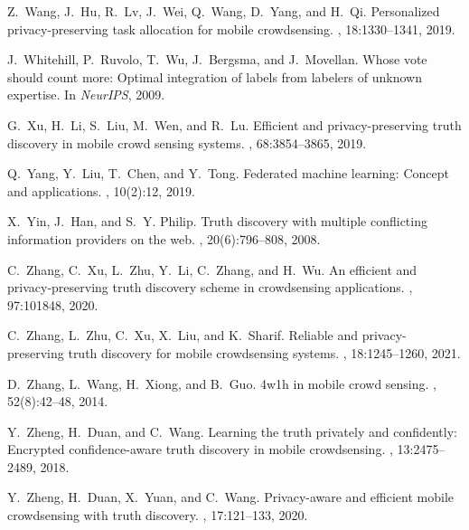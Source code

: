 \documentclass[11pt]{article}
\begin{document}
\begin{thebibliography}{10}
Z.~Wang, J.~Hu, R.~Lv, J.~Wei, Q.~Wang, D.~Yang, and H.~Qi.
\newblock Personalized privacy-preserving task allocation for mobile
  crowdsensing.
, 18:1330--1341, 2019.

J.~Whitehill, P.~Ruvolo, T.~Wu, J.~Bergsma, and J.~Movellan.
\newblock Whose vote should count more: Optimal integration of labels from
  labelers of unknown expertise.
\newblock In {\em NeurIPS}, 2009.

G.~Xu, H.~Li, S.~Liu, M.~Wen, and R.~Lu.
\newblock Efficient and privacy-preserving truth discovery in mobile crowd
  sensing systems.
, 68:3854--3865, 2019.

Q.~Yang, Y.~Liu, T.~Chen, and Y.~Tong.
\newblock Federated machine learning: Concept and applications.
,
  10(2):12, 2019.

X.~Yin, J.~Han, and S.~Y. Philip.
\newblock Truth discovery with multiple conflicting information providers on
  the web.
,
  20(6):796--808, 2008.

C.~Zhang, C.~Xu, L.~Zhu, Y.~Li, C.~Zhang, and H.~Wu.
\newblock An efficient and privacy-preserving truth discovery scheme in
  crowdsensing applications.
, 97:101848, 2020.

C.~Zhang, L.~Zhu, C.~Xu, X.~Liu, and K.~Sharif.
\newblock Reliable and privacy-preserving truth discovery for mobile
  crowdsensing systems.
,
  18:1245--1260, 2021.

D.~Zhang, L.~Wang, H.~Xiong, and B.~Guo.
\newblock 4w1h in mobile crowd sensing.
, 52(8):42--48, 2014.

Y.~Zheng, H.~Duan, and C.~Wang.
\newblock Learning the truth privately and confidently: Encrypted
  confidence-aware truth discovery in mobile crowdsensing.
,
  13:2475--2489, 2018.

Y.~Zheng, H.~Duan, X.~Yuan, and C.~Wang.
\newblock Privacy-aware and efficient mobile crowdsensing with truth discovery.
,
  17:121--133, 2020.

\end{thebibliography}




\end{document}
